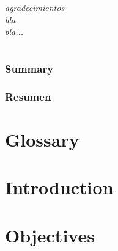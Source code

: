 \documentclass[a4paper,11pt,english]{report} %
\begin{document}
\pagestyle{empty}


\cleardoublepage

\cleardoublepage

\cleardoublepage


\chapter*{}
\thispagestyle{empty}

\begingroup
\begin{flushleft}
\itshape
agradecimientos\\
bla\\
bla...
\end{flushleft}
\endgroup

\cleardoublepage

\chapter*{}
\subsection*{Summary}

\subsection*{Resumen}


\pagestyle{plain}

\tableofcontents
\listoffigures
\listoftables
\cleardoublepage

\pagestyle{empty}
\chapter*{Glossary}

\cleardoublepage

\pagestyle{headings}



\chapter{Introduction}

\chapter{Objectives}

\end{document}
